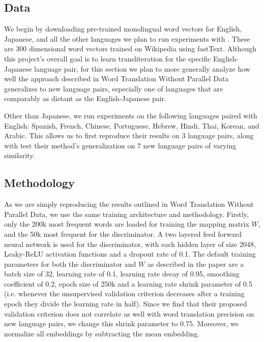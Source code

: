 \documentclass{article}
\begin{document}
\subsection*{Data}

We begin by downloading pre-trained monolingual word vectors for English, Japanese,
and all the other languages we plan to run experiments with \cite{bojanowski2017enriching}.
These are 300 dimensional word vectors trained on Wikipedia using fastText.
Although this project's overall goal is to learn transliteration for the specific
English-Japanese language pair, for this section we plan to more generally analyze
how well the approach described in Word Translation Without Parallel Data generalizes
to new language pairs, especially one of languages that are comparably as distant as
the English-Japanese pair.

Other than Japanese, we run experiments on the following languages paired with English:
Spanish, French, Chinese, Portuguese, Hebrew, Hindi, Thai, Korean, and Arabic. This
allows us to first reproduce their results on 3 language pairs, along with test their
method's generalization on 7 new language pairs of varying similarity.

\subsection*{Methodology}

As we are simply reproducing the results outlined in Word Translation Without Parallel
Data, we use the same training architecture and methodology. Firstly, only the 200k
most frequent words are loaded for training the mapping matrix $W$, and the 50k most
frequent for the discriminator. A two layered feed forward neural network is used
for the discriminator, with each hidden layer of size 2048, Leaky-ReLU activation
functions and a dropout rate of 0.1. The default training parameters for
both the discriminator and $W$ as described in the paper are a
batch size of 32, learning rate of 0.1, learning rate decay of 0.95, smoothing
coefficient of 0.2, epoch size of 250k and a learning rate shrink parameter of 0.5
(i.e. whenever the unsupervised validation criterion decreases after a training epoch
they divide the learning rate in half). Since we find that their proposed validation
criterion does not correlate as well with word translation precision on new language
pairs, we change this shrink parameter to 0.75. Moreover, we normalize all embeddings
by subtracting the mean embedding.
\end{document}
